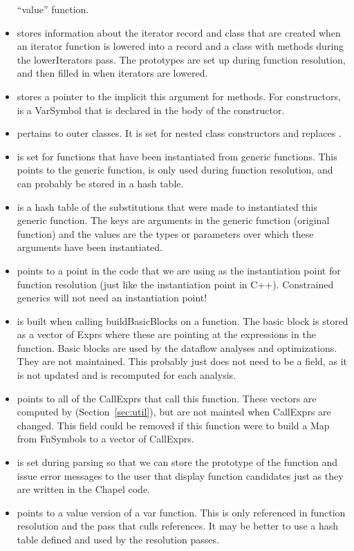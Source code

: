 \documentclass[10pt]{article}
\begin{document}
\begin{itemize}
  ``value'' function.
\item {} stores information about the
  iterator record and class that are created when an iterator function
  is lowered into a record and a class with methods during the
  lowerIterators pass.  The prototypes are set up during function
  resolution, and then filled in when iterators are lowered.
\item {} stores a pointer to the implicit this
  argument for methods.  For constructors,  is a VarSymbol
    that is declared in the body of the constructor.
\item {} pertains to outer classes.  It is set for
  nested class constructors and replaces .
\item {} is set for functions that have
  been instantiated from generic functions.  This points to the
  generic function, is only used during function resolution, and can
  probably be stored in a hash table.
\item {} is a hash table of the
  substitutions that were made to instantiated this generic function.
  The keys are arguments in the generic function (original function)
  and the values are the types or parameters over which these
  arguments have been instantiated.
\item {} points to a point in the code
  that we are using as the instantiation point for function resolution
  (just like the instantiation point in C++).  Constrained generics
  will not need an instantiation point!
\item {} is built when calling
  buildBasicBlocks on a function.  The basic block is stored as a
  vector of Exprs where these are pointing at the expressions in the
  function.  Basic blocks are used by the dataflow analyses and
  optimizations.  They are not maintained.  This probably just does
  not need to be a field, as it is not updated and is recomputed for
  each analysis.
\item {} points to all of the CallExprs
  that call this function.  These vectors are computed by
   (Section~\ref{sec:util}), but are not
  mainted when CallExprs are changed.  This field could be removed if
  this function were to build a Map from FnSymbols to a vector of
  CallExprs.
\item {} is set during parsing so that we can
  store the prototype of the function and issue error messages to the
  user that display function candidates just as they are written in
  the Chapel code.
\item {} points to a value version of a var
  function.  This is only referenced in function resolution and the
  pass that culls references.  It may be better to use a hash table
  defined and used by the resolution passes.
\end{itemize}
\end{document}

